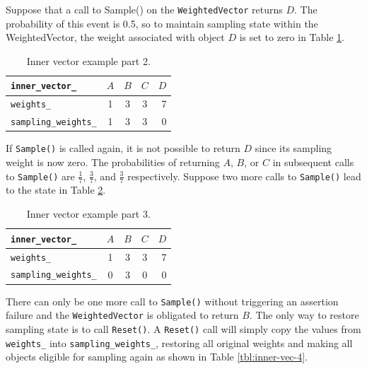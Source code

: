 \documentclass[12pt]{article}
\begin{document}
    \FloatBarrier

    Suppose that a call to Sample() on the \texttt{WeightedVector} returns $D$. The
    probability of this event is 0.5, so to maintain sampling state within the
    WeightedVector, the weight associated with object $D$ is set to zero in
    Table \ref{tbl:inner-vec-2}.

    \begin{table}[htbp]
      \caption{Inner vector example part 2.}
      \label{tbl:inner-vec-2}
      \begin{center}
      \begin{tabular}{ | l | c | c | c | r | }
        \hline
        \verb|inner_vector_| & $A$ & $B$ & $C$ & $D$ \\ \hline
        \verb|weights_| & 1 & 3 & 3 & 7 \\ \hline
        \verb|sampling_weights_| & 1 & 3 & 3 & 0 \\ \hline
        \hline
      \end{tabular}
      \end{center}
    \end{table}

    \FloatBarrier

    If \texttt{Sample()} is called again, it is not possible to return $D$ since its
    sampling weight is now zero. The probabilities of returning $A$, $B$, or
    $C$ in subsequent calls to \texttt{Sample()} are $\frac{1}{7}$, $\frac{3}{7}$, and
    $\frac{3}{7}$ respectively. Suppose two more calls to \texttt{Sample()} lead to the
    state in Table \ref{tbl:inner-vec-3}.

    \begin{table}[htbp]
      \caption{Inner vector example part 3.}
      \label{tbl:inner-vec-3}
      \begin{center}
      \begin{tabular}{ | l | c | c | c | r | }
        \hline
        \verb|inner_vector_| & $A$ & $B$ & $C$ & $D$ \\ \hline
        \verb|weights_| & 1 & 3 & 3 & 7 \\ \hline
        \verb|sampling_weights_| & 0 & 3 & 0 & 0 \\ \hline
        \hline
      \end{tabular}
      \end{center}
    \end{table}

    \FloatBarrier

    There can only be one more call to \texttt{Sample()} without triggering an
    assertion failure and the \texttt{WeightedVector} is obligated to return
    $B$. The only way to restore sampling state is to call \texttt{Reset()}. A
    \texttt{Reset()} call will simply copy the values from \texttt{weights\_}
    into \texttt{sampling\_weights\_}, restoring all original weights and
    making all objects eligible for sampling again as shown in Table
    \ref{tbl:inner-vec-4}.
\end{document}

